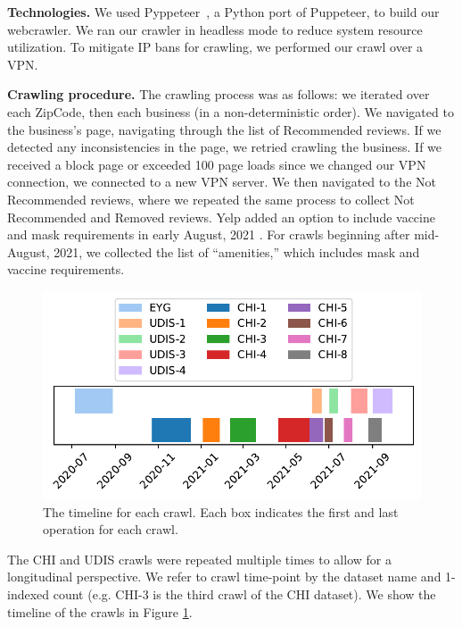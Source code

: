 \textbf{Technologies.}
We used Pyppeteer~\cite{miyakogi2019May}, a Python port of Puppeteer, to build our webcrawler. We ran our crawler in headless mode to reduce system resource utilization. To mitigate IP bans for crawling, we performed our crawl over a VPN.

\textbf{Crawling procedure.}
The crawling process was as follows: we iterated over each ZipCode, then each business (in a non-deterministic order). 
We navigated to the business's page, navigating through the list of Recommended reviews. If we detected any inconsistencies in the page, we retried crawling the business. If we received a block page or exceeded 100 page loads since we changed our VPN connection, we connected to a new VPN server. We then navigated to the Not Recommended reviews, where we repeated the same process to collect Not Recommended and Removed reviews. Yelp added an option to include vaccine and mask requirements in early August, 2021 \cite{yelp2021vaccination}. For crawls beginning after mid-August, 2021, we collected the list of ``amenities,'' which includes mask and vaccine requirements. 

\begin{figure}[h!]
    \centering
    \includegraphics[width=0.9\columnwidth]{chapters/reviews/figures/crawl_timeline.pdf}
    \caption[Crawl timeline]{The timeline for each crawl. Each box indicates the first and last operation for each crawl.}
    \label{fig:crawl_timeline}
\end{figure}

The CHI and UDIS crawls were repeated multiple times to allow for a longitudinal perspective. We refer to crawl time-point by the dataset name and 1-indexed count (e.g. CHI-3 is the third crawl of the CHI dataset). We show the timeline of the crawls in Figure \ref{fig:crawl_timeline}.

